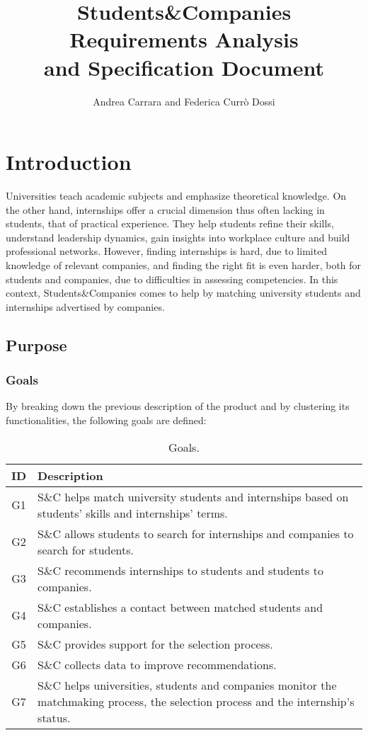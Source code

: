 \documentclass[a4paper, oneside]{book}
\title{
    Students\&Companies \\
    \Huge Requirements Analysis \\
    and Specification Document
}
\author{Andrea Carrara and Federica Currò Dossi}
\begin{document}
\maketitle

\tableofcontents

\chapter{Introduction}
Universities teach academic subjects and emphasize theoretical knowledge.
On the other hand, internships offer a crucial dimension thus often lacking in students, that of practical experience.
They help students refine their skills, understand leadership dynamics, gain insights into workplace culture and build professional networks.
However, finding internships is hard, due to limited knowledge of relevant companies, and finding the right fit is even harder, both for students and companies, due to difficulties in assessing competencies.
In this context, Students\&Companies comes to help by matching university students and internships advertised by companies.

\section{Purpose}
\subsection{Goals}
By breaking down the previous description of the product and by clustering its functionalities, the following goals are defined:

\begin{table}[h]
\renewcommand{\arraystretch}{1.5}
\begin{tabular}{|c|p{10.5 cm}|}
    \hline
    \textbf{ID} & \textbf{Description} \\ \hline \hline
    G1 & S\&C helps match university students and internships based on students' skills and internships' terms. \\ \hline
    G2 & S\&C allows students to search for internships and companies to search for students. \\ \hline
    G3 & S\&C recommends internships to students and students to companies. \\ \hline
    G4 & S\&C establishes a contact between matched students and companies. \\ \hline
    G5 & S\&C provides support for the selection process. \\ \hline
    G6 & S\&C collects data to improve recommendations. \\ \hline
    G7 & S\&C helps universities, students and companies monitor the matchmaking process, the selection process and the internship's status. \\ \hline
\end{tabular}
\caption{Goals.}
\end{table}
\end{document}
